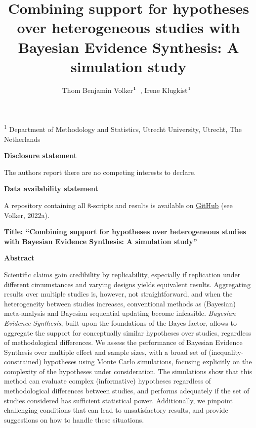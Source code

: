 \documentclass[
]{interact}
\title{Combining support for hypotheses over heterogeneous studies with
Bayesian Evidence Synthesis: A simulation study}
\author{Thom Benjamin
Volker$\textsuperscript{1}$~\orcidlink{0000-0002-2408-7820}, Irene
Klugkist$\textsuperscript{1}$~\orcidlink{0000-0001-9561-3691}}
\begin{document}
\maketitle
\textsuperscript{1} Department of Methodology and Statistics, Utrecht
University, Utrecht, The Netherlands
\ifdefined\Shaded\renewenvironment{Shaded}{\begin{tcolorbox}[borderline west={3pt}{0pt}{shadecolor}, boxrule=0pt, frame hidden, enhanced, breakable, sharp corners, interior hidden]}{\end{tcolorbox}}\fi

\doublespacing
{}

\textbf{Disclosure statement}

The authors report there are no competing interests to declare.

\textbf{Data availability statement}

A repository containing all \texttt{R}-scripts and results is available
on
\href{https://www.github.com/thomvolker/Master_Thesis/tree/master/MSBBSS/simulations}{GitHub}
(see Volker, 2022a).

\newpage

\textbf{Title: ``Combining support for hypotheses over heterogeneous
studies with Bayesian Evidence Synthesis: A simulation study''}

\textbf{Abstract}

Scientific claims gain credibility by replicability, especially if
replication under different circumstances and varying designs yields
equivalent results. Aggregating results over multiple studies is,
however, not straightforward, and when the heterogeneity between studies
increases, conventional methods as (Bayesian) meta-analysis and Bayesian
sequential updating become infeasible. \emph{Bayesian Evidence
Synthesis}, built upon the foundations of the Bayes factor, allows to
aggregate the support for conceptually similar hypotheses over studies,
regardless of methodological differences. We assess the performance of
Bayesian Evidence Synthesis over multiple effect and sample sizes, with
a broad set of (inequality-constrained) hypotheses using Monte Carlo
simulations, focusing explicitly on the complexity of the hypotheses
under consideration. The simulations show that this method can evaluate
complex (informative) hypotheses regardless of methodological
differences between studies, and performs adequately if the set of
studies considered has sufficient statistical power. Additionally, we
pinpoint challenging conditions that can lead to unsatisfactory results,
and provide suggestions on how to handle these situations.
\end{document}
